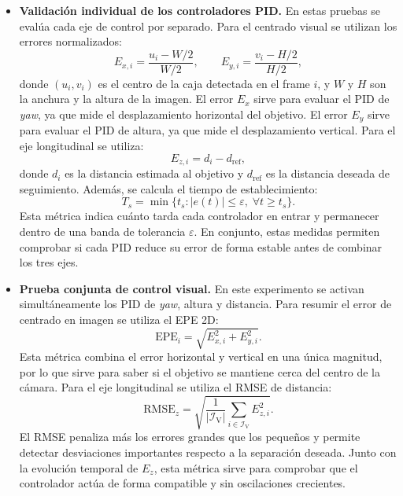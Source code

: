 \begin{itemize}
    \item \textbf{Validación individual de los controladores PID.} En estas pruebas se evalúa cada eje de control por separado. Para el centrado visual se utilizan los errores normalizados:
    \[
    E_{x,i}=\frac{u_i-W/2}{W/2}, \qquad E_{y,i}=\frac{v_i-H/2}{H/2},
    \]
    donde $(u_i,v_i)$ es el centro de la caja detectada en el frame $i$, y $W$ y $H$ son la anchura y la altura de la imagen. El error $E_x$ sirve para evaluar el PID de \textit{yaw}, ya que mide el desplazamiento horizontal del objetivo. El error $E_y$ sirve para evaluar el PID de altura, ya que mide el desplazamiento vertical. Para el eje longitudinal se utiliza:
    \[
    E_{z,i}=d_i-d_{\mathrm{ref}},
    \]
    donde $d_i$ es la distancia estimada al objetivo y $d_{\mathrm{ref}}$ es la distancia deseada de seguimiento. Además, se calcula el tiempo de establecimiento:
    \[
    T_s=\min\{t_s: |e(t)|\leq\varepsilon,\; \forall t\geq t_s\}.
    \]
    Esta métrica indica cuánto tarda cada controlador en entrar y permanecer dentro de una banda de tolerancia $\varepsilon$. En conjunto, estas medidas permiten comprobar si cada PID reduce su error de forma estable antes de combinar los tres ejes.

    \item \textbf{Prueba conjunta de control visual.} En este experimento se activan simultáneamente los PID de \textit{yaw}, altura y distancia. Para resumir el error de centrado en imagen se utiliza el EPE 2D:
    \[
    \mathrm{EPE}_i=\sqrt{E_{x,i}^{2}+E_{y,i}^{2}}.
    \]
    Esta métrica combina el error horizontal y vertical en una única magnitud, por lo que sirve para saber si el objetivo se mantiene cerca del centro de la cámara. Para el eje longitudinal se utiliza el RMSE de distancia:
    \[
    \mathrm{RMSE}_{z}=\sqrt{\frac{1}{|\mathcal{I}_{\mathrm{V}}|}\sum_{i\in\mathcal{I}_{\mathrm{V}}}E_{z,i}^{2}}.
    \]
    El RMSE penaliza más los errores grandes que los pequeños y permite detectar desviaciones importantes respecto a la separación deseada. Junto con la evolución temporal de  $E_z$, esta métrica sirve para comprobar que el controlador actúa de forma compatible y sin oscilaciones crecientes.


\end{itemize}
